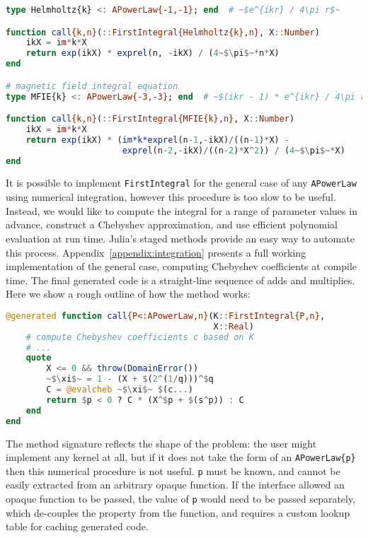 \begin{singlespace}
\begin{lstlisting}[language=julia]
type Helmholtz{k} <: APowerLaw{-1,-1}; end  # ~$e^{ikr} / 4\pi r$~

function call{k,n}(::FirstIntegral{Helmholtz{k},n}, X::Number)
    ikX = im*k*X
    return exp(ikX) * exprel(n, -ikX) / (4~$\pi$~*n*X)
end

# magnetic field integral equation
type MFIE{k} <: APowerLaw{-3,-3}; end  # ~$(ikr - 1) * e^{ikr} / 4\pi r^3$~

function call{k,n}(::FirstIntegral{MFIE{k},n}, X::Number)
    ikX = im*k*X
    return exp(ikX) * (im*k*exprel(n-1,-ikX)/((n-1)*X) -
                       exprel(n-2,-ikX)/((n-2)*X^2)) / (4~$\pi$~*X)
end
\end{lstlisting}
\end{singlespace}

It is possible to implement \texttt{FirstIntegral} for the general
case of any \texttt{APowerLaw} using numerical integration, however
this procedure is too slow to be useful.
Instead, we would like to compute the integral for a range of
parameter values in advance, construct a Chebyshev approximation,
and use efficient polynomial evaluation at run time.
Julia's staged methods provide an easy way to automate this process.
Appendix~\ref{appendix:integration} presents a full working implementation of
the general case, computing Chebyshev coefficients at compile time.
The final generated code is a straight-line sequence of adds and multiplies.
Here we show a rough outline of how the method works:

\begin{singlespace}
\begin{lstlisting}[language=julia]
@generated function call{P<:APowerLaw,n}(K::FirstIntegral{P,n},
                                         X::Real)
    # compute Chebyshev coefficients c based on K
    # ...
    quote
        X <= 0 && throw(DomainError())
        ~$\xi$~ = 1 - (X + $(2^(1/q)))^$q
        C = @evalcheb ~$\xi$~ $(c...)
        return $p < 0 ? C * (X^$p + $(s^p)) : C
    end
end
\end{lstlisting}
\end{singlespace}

The method signature reflects the shape of the problem: the user might
implement any kernel at all, but if it does not take the form of an
\texttt{APowerLaw\{p\}} then this numerical procedure is not useful.
\texttt{p} must be known, and cannot be easily extracted from an arbitrary
opaque function.
If the interface allowed an opaque function to be passed, the value of
\texttt{p} would need to be passed separately, which de-couples the
property from the function, and requires a custom lookup table for caching
generated code.

